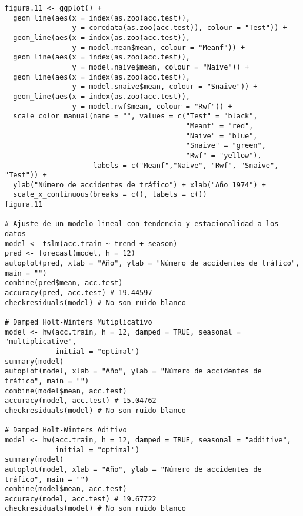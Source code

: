 \documentclass[12pt,a4paper,oneside]{article}
\begin{document}
\begin{Verbatim}[fontsize=\footnotesize]
figura.11 <- ggplot() +
  geom_line(aes(x = index(as.zoo(acc.test)),
                y = coredata(as.zoo(acc.test)), colour = "Test")) +
  geom_line(aes(x = index(as.zoo(acc.test)),
                y = model.mean$mean, colour = "Meanf")) +
  geom_line(aes(x = index(as.zoo(acc.test)),
                y = model.naive$mean, colour = "Naive")) +
  geom_line(aes(x = index(as.zoo(acc.test)),
                y = model.snaive$mean, colour = "Snaive")) +
  geom_line(aes(x = index(as.zoo(acc.test)),
                y = model.rwf$mean, colour = "Rwf")) +
  scale_color_manual(name = "", values = c("Test" = "black",
                                           "Meanf" = "red",
                                           "Naive" = "blue",
                                           "Snaive" = "green",
                                           "Rwf" = "yellow"),
                     labels = c("Meanf","Naive", "Rwf", "Snaive", "Test")) +
  ylab("Número de accidentes de tráfico") + xlab("Año 1974") +
  scale_x_continuous(breaks = c(), labels = c())
figura.11

# Ajuste de un modelo lineal con tendencia y estacionalidad a los datos
model <- tslm(acc.train ~ trend + season)
pred <- forecast(model, h = 12)
autoplot(pred, xlab = "Año", ylab = "Número de accidentes de tráfico", main = "")
combine(pred$mean, acc.test)
accuracy(pred, acc.test) # 19.44597
checkresiduals(model) # No son ruido blanco

# Damped Holt-Winters Mutiplicativo
model <- hw(acc.train, h = 12, damped = TRUE, seasonal = "multiplicative",
            initial = "optimal")
summary(model)
autoplot(model, xlab = "Año", ylab = "Número de accidentes de tráfico", main = "")
combine(model$mean, acc.test)
accuracy(model, acc.test) # 15.04762
checkresiduals(model) # No son ruido blanco

# Damped Holt-Winters Aditivo
model <- hw(acc.train, h = 12, damped = TRUE, seasonal = "additive",
            initial = "optimal")
summary(model)
autoplot(model, xlab = "Año", ylab = "Número de accidentes de tráfico", main = "")
combine(model$mean, acc.test)
accuracy(model, acc.test) # 19.67722
checkresiduals(model) # No son ruido blanco


\end{Verbatim}
\end{document}
